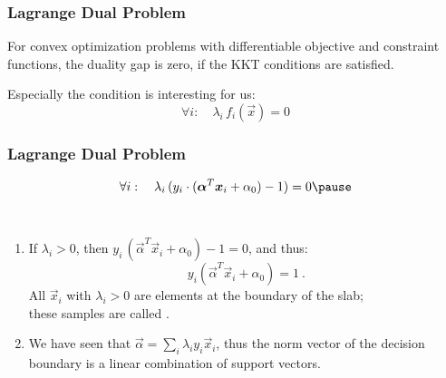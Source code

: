 \begin{frame}
  \frametitle{Lagrange Dual Problem \cont}
 
  For convex optimization problems with differentiable objective and constraint functions, the duality gap is zero,
  if the KKT conditions are satisfied. \\[.5cm] \pause 

  Especially the  condition is interesting for us:
  \begin{displaymath}
    \forall i: \quad \lambda_i \, f_i(\vec{x}) = 0 
  \end{displaymath}
\end{frame}


\begin{frame}
  \frametitle{Lagrange Dual Problem \cont}
 

  \begin{displaymath}
    \forall i: \quad \lambda_i \, (y_i\cdot (\vec \alpha^T\vec x_i + \alpha_0) - 1) = 0 \pause
  \end{displaymath}
 
   \\[.2cm]
  
  \begin{enumerate}
    \item If $\lambda_i>0$, then $y_i \, (\vec{\alpha}^T \vec{x}_i + \alpha_0) - 1=0$, and thus:
      \begin{displaymath}
        y_i(\vec{\alpha}^T \vec{x}_i + \alpha_0) = 1~.
      \end{displaymath}
      All $\vec x_i$ with $\lambda_i>0$  are elements at the boundary of the slab; \\
      these samples are called . \\[.2cm] \pause
    \item We have seen that $  \vec \alpha = \sum_i \lambda_i y_i \vec x_i $, thus the norm vector of the decision boundary is a linear combination of support vectors.
  \end{enumerate}
\end{frame}


